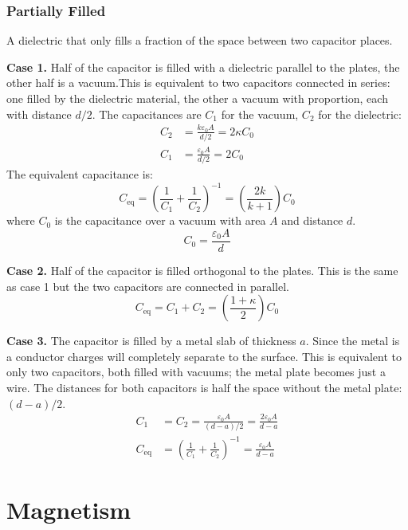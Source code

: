 \documentclass{article}
\begin{document}
\subsubsection{Partially Filled}

A dielectric that only fills a fraction of the space between two capacitor places.

\textbf{Case 1.} Half of the capacitor is filled with a dielectric parallel to the plates, the other half is a vacuum.This is equivalent to two capacitors connected in series: one filled by the dielectric material, the other a vacuum with proportion, each with distance $d/2$. The capacitances are $C_1$ for the vacuum, $C_2$ for the dielectric:
\begin{align*}
	C_2&=\frac{k\varepsilon_0 A}{d/2}=2\kappa C_0 \\
	C_1&=\frac{\varepsilon_0 A}{d/2}=2C_0
\end{align*}
The equivalent capacitance is:
\begin{equation*}
	C_\text{eq}
	=\left( \frac{1}{C_1}+\frac{1}{C_2} \right)^{-1}
	=\left( \frac{2k}{k+1} \right)C_0
\end{equation*}
where $C_0$ is the capacitance over a vacuum with area $A$ and distance $d$.
\begin{equation*}
    C_0=\frac{\varepsilon_0 A}{d}
\end{equation*}

\textbf{Case 2.} Half of the capacitor is filled orthogonal to the plates. This is the same as case 1 but the two capacitors are connected in parallel.
\begin{equation*}
	C_\text{eq}=C_1+C_2=\left( \frac{1+\kappa}{2} \right)C_0
\end{equation*}

\textbf{Case 3.} The capacitor is filled by a metal slab of thickness $a$. Since the metal is a conductor charges will completely separate to the surface. This is equivalent to only two capacitors, both filled with vacuums; the metal plate becomes just a wire. The distances for both capacitors is half the space without the metal plate: $(d-a)/2$.
\begin{align*}
	C_1&=C_2=\frac{\varepsilon_0A}{(d-a)/2}=\frac{2\varepsilon_0A}{d-a} \\
	C_\text{eq}&=\left( \frac{1}{C_1}+\frac{1}{C_2} \right)^{-1}=\frac{\varepsilon_0A}{d-a}
\end{align*}

\section{Magnetism}
\end{document}
